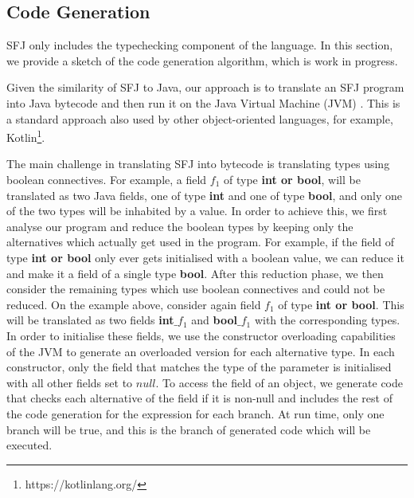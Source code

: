 \documentclass[runningheads]{llncs}
\begin{document}

\subsection{Code Generation}
\label{sec:code_generation}
SFJ only includes the typechecking component of the language. In this section, we provide a sketch of the code generation algorithm, which is work in progress.

Given the similarity of SFJ to Java, our approach is to translate an SFJ program into Java bytecode and then run it on the Java Virtual Machine (JVM) \cite{lindholm2013}. This is a standard approach also used by other object-oriented languages, for example, Kotlin\footnote{https://kotlinlang.org/}. 

The main challenge in translating SFJ into bytecode is translating types using boolean connectives.
%
For example, a field $f_1$ of type \textbf{int or bool}, will be translated as two Java fields, one of type \textbf{int} and one of type \textbf{bool}, and only one of the two types will be inhabited by a value. 
%
In order to achieve this, we first analyse our program and reduce the boolean types by keeping only the alternatives which actually get used in the program.
For example, if the field of type \textbf{int or bool} only ever gets initialised with a boolean value, we can reduce it and make it a field of a single type \textbf{bool}.
%
After this reduction phase, we then consider the remaining types which use boolean connectives and could not be reduced.
On the example above, consider again field $f_1$ of type \textbf{int or bool}. This will be translated as two fields \textbf{int}$\_{f_1}$ and \textbf{bool}$\_{f_1}$ with the corresponding types.
In order to initialise these fields, we use the constructor overloading capabilities of the JVM to generate an overloaded version for each alternative type.
In each constructor, only the field that matches the type of the parameter is initialised with all other fields set to $null$.
%
To access the field of an object, we generate code that checks each alternative of the field if it is non-null and includes the rest of the code generation for the expression for each branch. At run time, only one branch will be true, and this is the branch of generated code which will be executed.
\end{document}
